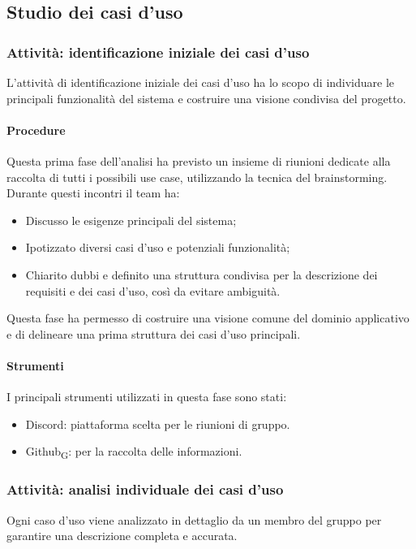\documentclass[11pt,a4paper]{article}
\newcommand{\gls}[1]{#1\textsubscript{G}}
\begin{document}
\subsection{Studio dei casi d'uso}

\subsubsection{Attività: identificazione iniziale dei casi d'uso}
L’attività di identificazione iniziale dei casi d’uso ha lo scopo di individuare le principali funzionalità del sistema e costruire una visione condivisa del progetto.

\paragraph{Procedure}
Questa prima fase dell’analisi ha previsto un insieme di riunioni dedicate alla raccolta di tutti i possibili use case, utilizzando la tecnica del brainstorming. Durante questi incontri il team ha:
\begin{itemize}
\item Discusso le esigenze principali del sistema;
\item Ipotizzato diversi casi d’uso e potenziali funzionalità;
\item Chiarito dubbi e definito una struttura condivisa per la descrizione dei requisiti e dei casi d’uso, così da evitare ambiguità.
\end{itemize}
Questa fase ha permesso di costruire una visione comune del dominio applicativo e di delineare una prima struttura dei casi d’uso principali.

\paragraph{Strumenti}
I principali strumenti utilizzati in questa fase sono stati:
\begin{itemize}
\item Discord: piattaforma scelta per le riunioni di gruppo.
\item \gls{Github}: per la raccolta delle informazioni.
\end{itemize}

\subsubsection{Attività: analisi individuale dei casi d'uso}
Ogni caso d’uso viene analizzato in dettaglio da un membro del gruppo per garantire una descrizione completa e accurata.
\end{document}
